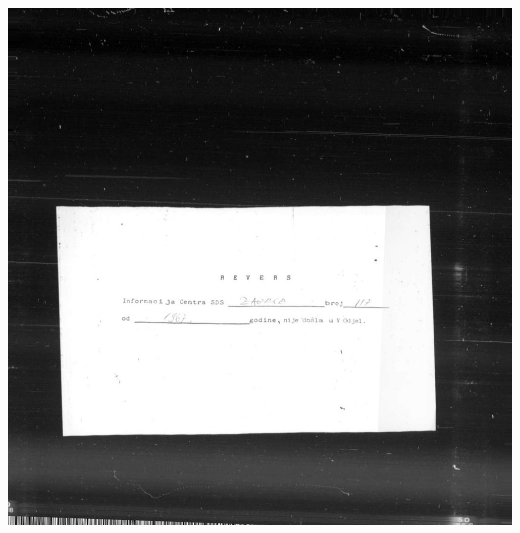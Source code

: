 \documentclass{article}
\begin{document}
\begin{center}
    \includegraphics[scale=0.1]{Z05353721_deskewed.jpg}
\end{center}
\end{document}
